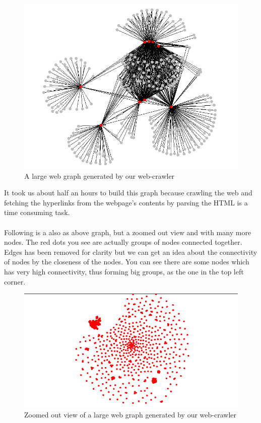 \documentclass[12pt]{report}
\numberwithin{figure}{section}
\numberwithin{table}{section}
\begin{document}
\begin{figure}[H]
\centering
\includegraphics[scale=0.6]{images/web-graph}
\caption{A large web graph generated by our web-crawler}
\end{figure}

It took us about half an hours to build this graph because crawling the web and fetching the hyperlinks from the webpage’s contents by parsing the HTML is a time consuming task. 

\paragraph{}

Following is a also as above graph, but a zoomed out view and with many more nodes. The red dots you see are actually groups of nodes connected together. Edges has been removed for clarity but we can get an idea about the connectivity of nodes by the closeness of the nodes. You can see there are some nodes which has very high connectivity, thus forming big groups, as the one in the top left corner. 

\begin{figure}[H]
\centering
\includegraphics[scale=0.8]{images/graph2}
\caption[Zoomed out view of a large web graph]{Zoomed out view of a large web graph generated by our web-crawler}
\end{figure}
\end{document}
